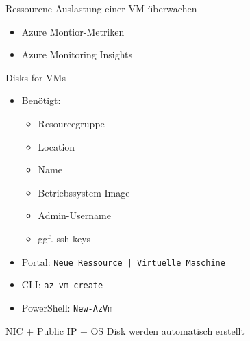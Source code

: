 
\begin{flashcard}[Definition]{Ressourcne-Auslastung einer VM überwachen}
    \begin{itemize}
        \item Azure Montior-Metriken
        \item Azure Monitoring Insights
    \end{itemize}
\end{flashcard}



\begin{flashcard}[Definition]{Disks for VMs}
    \begin{itemize}
        \item Benötigt:
            \begin{itemize}
                \item Resourcegruppe
                \item Location
                \item Name
                \item Betriebssystem-Image
                \item Admin-Username
                \item ggf. ssh keys
            \end{itemize}
        \item Portal: \texttt{Neue Ressource | Virtuelle Maschine}
        \item CLI: \texttt{az vm create}
        \item PowerShell: \texttt{New-AzVm}
    \end{itemize}
    NIC + Public IP + OS Disk werden automatisch erstellt
\end{flashcard}

